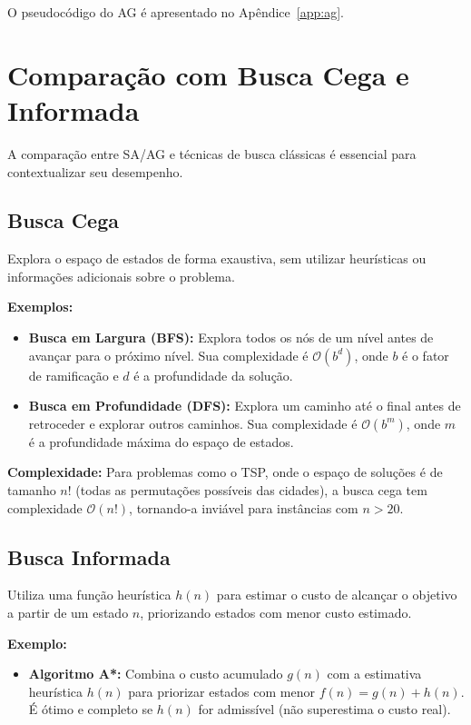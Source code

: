 \documentclass[11pt]{article}
\begin{document}
O pseudocódigo do AG é apresentado no Apêndice~\ref{app:ag}.

\section{Comparação com Busca Cega e Informada}
A comparação entre SA/AG e técnicas de busca clássicas é essencial para contextualizar seu desempenho.

\subsection{Busca Cega}
Explora o espaço de estados de forma exaustiva, sem utilizar heurísticas ou informações adicionais sobre o problema.

\textbf{Exemplos:}
\begin{itemize}
    \item \textbf{Busca em Largura (BFS):} Explora todos os nós de um nível antes de avançar para o próximo nível. Sua complexidade é \(\mathcal{O}(b^d)\), onde \(b\) é o fator de ramificação e \(d\) é a profundidade da solução.
    \item \textbf{Busca em Profundidade (DFS):} Explora um caminho até o final antes de retroceder e explorar outros caminhos. Sua complexidade é \(\mathcal{O}(b^m)\), onde \(m\) é a profundidade máxima do espaço de estados.
\end{itemize}

\textbf{Complexidade:} Para problemas como o TSP, onde o espaço de soluções é de tamanho \(n!\) (todas as permutações possíveis das cidades), a busca cega tem complexidade \(\mathcal{O}(n!)\), tornando-a inviável para instâncias com \(n > 20\).

\subsection{Busca Informada}
Utiliza uma função heurística \(h(n)\) para estimar o custo de alcançar o objetivo a partir de um estado \(n\), priorizando estados com menor custo estimado.

\textbf{Exemplo:}
\begin{itemize}
    \item \textbf{Algoritmo A*:} Combina o custo acumulado \(g(n)\) com a estimativa heurística \(h(n)\) para priorizar estados com menor \(f(n) = g(n) + h(n)\). É ótimo e completo se \(h(n)\) for admissível (não superestima o custo real).
\end{itemize}
\end{document}
